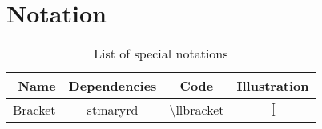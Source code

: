 \section{Notation} 
\begin{table}
\center
\caption{List of special notations}
\begin{tabular}{rccc}
  \toprule
  
  \textbf{Name} & \textbf{Dependencies} & \textbf{Code} & \textbf{Illustration} \\ \hline
  Bracket & stmaryrd & $\setminus$llbracket & $\llbracket$ \\ 
  \bottomrule
\end{tabular}
\end{table}
